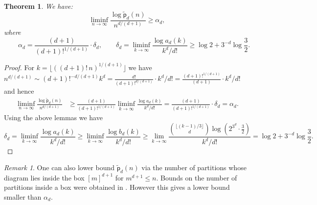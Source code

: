 \documentclass[12pt]{amsart}
\newtheorem{theorem}{Theorem}[section]
\theoremstyle{definition}
\theoremstyle{remark}
\newtheorem{remark}{Remark}
\begin{document}
\begin{theorem}\label{coral}
We have:
$$
\liminf_{n \to \infty} \frac{\log \widetilde{\mathsf{p}}_{d}(n)}{n^{d/(d+1)}} \ge 
\alpha_d,  %
$$
where 
$$
 \qquad \alpha_d =  \frac{(d+1) }{(d+1)!^{1/(d+1)}} \cdot \delta_d, \qquad 
 \delta_d = \liminf_{k \to \infty} \frac{\log a_d(k)}{k^d/d!} \ge \log 2 + 3^{-d} \log \frac{3}{2}. %
$$
\end{theorem}
\begin{proof}
For $k  = \lfloor ((d+1)!\, n)^{1/(d+1)} \rfloor$ we have $n^{d/(d+1)} \sim (d+1)!^{-d/(d+1)} k^d = \frac{d!}{(d+1)!^{d/(d+1)}}\cdot k^d/d! = \frac{(d+1)!^{1/(d+1)}}{(d+1)} \cdot k^d/d!$ and hence
\begin{align*}
\liminf_{n \to \infty} \frac
{\log \widetilde{\mathsf{p}}_{d}(n)}
{n^{d/(d+1)}} 
&\ge  \frac{(d+1)}{(d+1)!^{1/(d+1)}} \liminf_{k \to \infty} \frac{\log a_{d}(k)}{k^d/d!} = \frac{(d+1)}{(d+1)!^{1/(d+1)}} \cdot \delta_d = \alpha_d.  
\end{align*}
Using the above lemmas we have 
$$
\delta_d = \liminf_{k \to \infty} \frac{\log a_d(k)}{k^d/d!} \ge \liminf_{k \to \infty} \frac{\log b_d(k)}{k^d/d!} \ge \lim_{k \to \infty} \frac{\binom{\lfloor (k-1)/3 \rfloor }{d} \log \left(2^{3^d} \cdot \frac{3}{2} \right)}{k^d/d!} = \log 2 + 3^{-d} \log \frac{3}{2}.
$$
\end{proof}

\begin{remark}
One can also lower bound $\widetilde{\mathsf{p}}_{d}(n)$ via the number of partitions whose diagram lies inside the box $[m]^{d+1}$ for $m^{d+1} \le n$. Bounds on the number of partitions inside a box were obtained in \cite{ms}. However this gives a lower bound smaller than $\alpha_d$. 
\end{remark}
\end{document}
